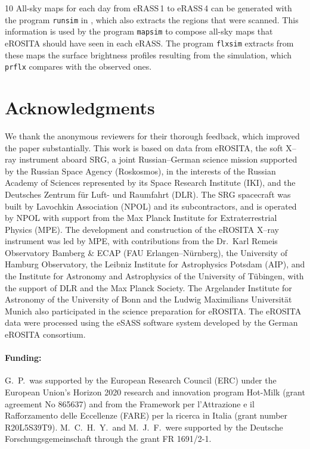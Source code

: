 \documentclass[12pt]{article}
\newcommand{\erass}{eRASS\,}
\begin{document}
\begin{thebibliography}{10}
All-sky maps for each day from \erass1 to \erass4 can be generated with the
  program {\tt runsim} in \cite{zenodo_doi}, which also extracts the regions
  that were scanned.
  This information is used by the program {\tt mapsim} to compose all-sky maps
  that eROSITA should have seen in each eRASS. The program {\tt flxsim}
  extracts from these maps the surface brightness profiles resulting from the
  simulation, which {\tt prflx} compares with the observed ones.

\end{thebibliography}



\section*{Acknowledgments}
We thank the anonymous reviewers for their thorough feedback, which improved the paper substantially. This work is based on data from eROSITA, the soft X--ray instrument aboard SRG, a joint Russian--German science mission supported by the Russian Space Agency (Roskosmos), in the interests of the Russian Academy of Sciences represented by its Space Research Institute (IKI), and the Deutsches Zentrum f\"ur Luft- und Raumfahrt (DLR). The SRG spacecraft was built by Lavochkin Association (NPOL) and its subcontractors, and is operated by NPOL with support from the Max Planck Institute for Extraterrestrial Physics (MPE). The development and construction of the eROSITA X--ray instrument was led by MPE, with contributions from the Dr.~Karl Remeis Observatory Bamberg \& ECAP (FAU Erlangen--N\"urnberg), the University of Hamburg Observatory, the Leibniz Institute for Astrophysics Potsdam (AIP), and the Institute for Astronomy and Astrophysics of the University of T\"ubingen, with the support of DLR and the Max Planck Society. The Argelander Institute for Astronomy of the University of Bonn and the Ludwig Maximilians Universit\"at Munich also participated in the science preparation for eROSITA. The eROSITA data were processed using the eSASS software system developed by the German eROSITA consortium.

\paragraph*{Funding:}
G.~P.~was supported by the European Research Council (ERC) under the European Union's Horizon 2020 research and innovation program Hot-Milk (grant agreement No 865637) and from the Framework per l'Attrazione e il Rafforzamento delle Eccellenze (FARE) per la ricerca in Italia (grant number R20L5S39T9).
M.~C.~H.~Y.~and M.~J.~F.~were supported by the Deutsche Forschungsgemeinschaft through the grant FR 1691/2-1.
\end{document}
